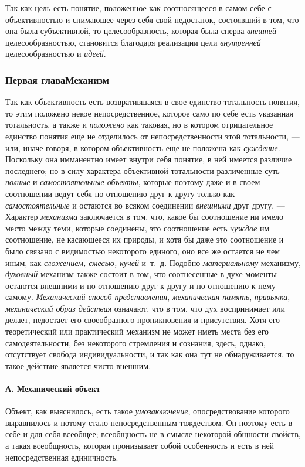 \documentclass[twoside]{article}
\begin{document}
{{{{{{Так как цель есть понятие, положенное как соотносящееся в
самом себе с объективностью и снимающее через себя свой недостаток,
состоявший в том, что она была субъективной, то целесообразность, которая
была сперва {\em внешней}
целесообразностью, становится благодаря реализации цели
{\em внутренней}
целесообразностью и
{\em идеей}.

\subsubsection[Первая глава Механизм]{Первая глава\newline Механизм}
Так как объективность есть возвратившаяся в свое единство
тотальность понятия, то этим положено некое непосредственное, которое само
по себе есть указанная тотальность, а также и
{\em положено} как
таковая, но в котором отрицательное единство понятия еще не отделилось от
непосредственности этой тотальности, — или, иначе говоря, в
котором объективность еще не положена как
{\em суждение}. Поскольку
она имманентно имеет внутри себя понятие, в ней имеется различие
последнего; но в силу характера объективной тотальности различенные суть
{\em полные} и
{\em самостоятельные объекты},
которые поэтому даже и в своем соотношении ведут себя по
отношению друг к другу только как
{\em самостоятельные} и
остаются во всяком соединении
{\em внешними} друг
другу. — Характер
{\em механизма}
заключается в том, что, какое бы соотношение ни имело место
между теми, которые соединены, это соотношение есть
{\em чуждое} им
соотношение, не касающееся их природы, и хотя бы даже это соотношение и
было связано с видимостью некоторого единого, оно все же остается не чем
иным, как {\em сложением, смесью,
кучей} и~т.~д. Подобно
{\em материальному}
механизму, {\em духовный}
механизм также состоит в том, что соотнесенные в духе моменты
остаются внешними и по отношению друг к другу и по отношению к нему самому.
{\em Механический способ
представления}, {\em механическая
память},{\em 
привычка},{\em 
механический образ действия} означают, что в
том, что дух воспринимает или делает, недостает его
своеобразного проникновения и присутствия. Хотя его
теоретический или практический механизм не может иметь места без его
самодеятельности, без некоторого стремления и сознания, здесь, однако,
отсутствует свобода индивидуальности, и так как она тут не обнаруживается,
то такое действие является чисто внешним.

\paragraph[А. Механический объект]{А. Механический объект}
Объект, как выяснилось, есть такое
{\em умозаключение},
опосредствование которого выравнилось и потому стало
непосредственным тождеством. Он поэтому есть в себе и для себя всеобщее;
всеобщность не в смысле некоторой общности свойств, а такая всеобщность,
которая пронизывает собой особенность и есть в ней непосредственная
единичность.

}}}}}}
\end{document}
